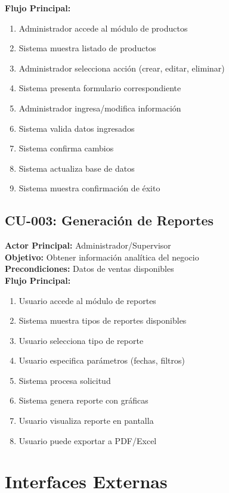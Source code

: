 \documentclass[12pt,letterpaper]{article}
\begin{document}
\textbf{Flujo Principal:}
\begin{enumerate}
    \item Administrador accede al módulo de productos
    \item Sistema muestra listado de productos
    \item Administrador selecciona acción (crear, editar, eliminar)
    \item Sistema presenta formulario correspondiente
    \item Administrador ingresa/modifica información
    \item Sistema valida datos ingresados
    \item Sistema confirma cambios
    \item Sistema actualiza base de datos
    \item Sistema muestra confirmación de éxito
\end{enumerate}

\subsection{CU-003: Generación de Reportes}
\textbf{Actor Principal:} Administrador/Supervisor \\
\textbf{Objetivo:} Obtener información analítica del negocio \\
\textbf{Precondiciones:} Datos de ventas disponibles \\

\textbf{Flujo Principal:}
\begin{enumerate}
    \item Usuario accede al módulo de reportes
    \item Sistema muestra tipos de reportes disponibles
    \item Usuario selecciona tipo de reporte
    \item Usuario especifica parámetros (fechas, filtros)
    \item Sistema procesa solicitud
    \item Sistema genera reporte con gráficas
    \item Usuario visualiza reporte en pantalla
    \item Usuario puede exportar a PDF/Excel
\end{enumerate}

\section{Interfaces Externas}
\end{document}
